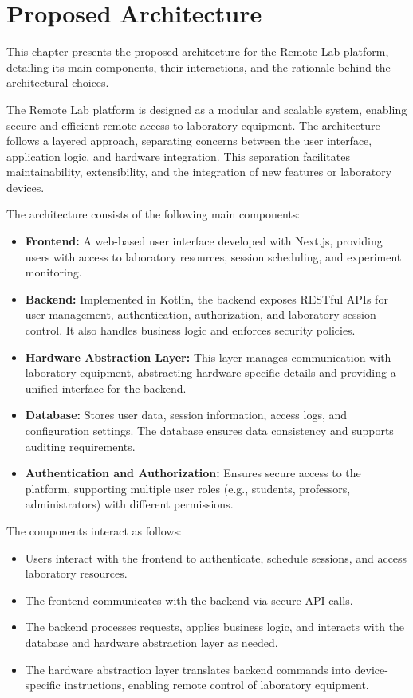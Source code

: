 %
%
\chapter{Proposed Architecture} \label{cap:proposed-architecture}

This chapter presents the proposed architecture for the Remote Lab platform, detailing its main components, their interactions, and the rationale behind the architectural choices.

The Remote Lab platform is designed as a modular and scalable system, enabling secure and efficient remote access to laboratory equipment. The architecture follows a layered approach, separating concerns between the user interface, application logic, and hardware integration. This separation facilitates maintainability, extensibility, and the integration of new features or laboratory devices.

The architecture consists of the following main components:
\begin{itemize}
    \item \textbf{Frontend:} A web-based user interface developed with Next.js, providing users with access to laboratory resources, session scheduling, and experiment monitoring.
    \item \textbf{Backend:} Implemented in Kotlin, the backend exposes RESTful APIs for user management, authentication, authorization, and laboratory session control. It also handles business logic and enforces security policies.
    \item \textbf{Hardware Abstraction Layer:} This layer manages communication with laboratory equipment, abstracting hardware-specific details and providing a unified interface for the backend.
    \item \textbf{Database:} Stores user data, session information, access logs, and configuration settings. The database ensures data consistency and supports auditing requirements.
    \item \textbf{Authentication and Authorization:} Ensures secure access to the platform, supporting multiple user roles (e.g., students, professors, administrators) with different permissions.
\end{itemize}

The components interact as follows:
\begin{itemize}
    \item Users interact with the frontend to authenticate, schedule sessions, and access laboratory resources.
    \item The frontend communicates with the backend via secure API calls.
    \item The backend processes requests, applies business logic, and interacts with the database and hardware abstraction layer as needed.
    \item The hardware abstraction layer translates backend commands into device-specific instructions, enabling remote control of laboratory equipment.
\end{itemize}

